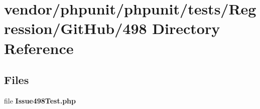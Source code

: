 \section{vendor/phpunit/phpunit/tests/\+Regression/\+Git\+Hub/498 Directory Reference}
\label{dir_5492247c99c5f99bc3cd1956f784de61}
\subsection*{Files}
\begin{DoxyCompactItemize}
\item 
file {\bf Issue498\+Test.\+php}
\end{DoxyCompactItemize}
